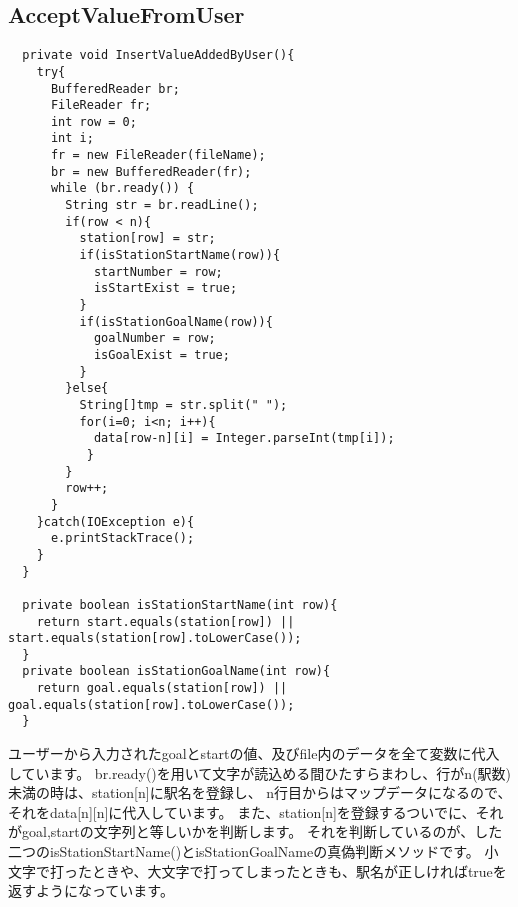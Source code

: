 \documentclass[titlepage]{jarticle}
\begin{document}
\subsection{AcceptValueFromUser}
\begin{verbatim}
  private void InsertValueAddedByUser(){
    try{
      BufferedReader br;
      FileReader fr;
      int row = 0;
      int i;
      fr = new FileReader(fileName);
      br = new BufferedReader(fr);
      while (br.ready()) {
        String str = br.readLine();
        if(row < n){
          station[row] = str;
          if(isStationStartName(row)){
            startNumber = row;
            isStartExist = true;
          }
          if(isStationGoalName(row)){
            goalNumber = row;
            isGoalExist = true;
          }
        }else{
          String[]tmp = str.split(" ");
          for(i=0; i<n; i++){
            data[row-n][i] = Integer.parseInt(tmp[i]);
           }
        }
        row++;
      }
    }catch(IOException e){
      e.printStackTrace();
    }
  }

  private boolean isStationStartName(int row){
    return start.equals(station[row]) || start.equals(station[row].toLowerCase());
  }
  private boolean isStationGoalName(int row){
    return goal.equals(station[row]) || goal.equals(station[row].toLowerCase());
  }

\end{verbatim}

ユーザーから入力されたgoalとstartの値、及びfile内のデータを全て変数に代入しています。
br.ready()を用いて文字が読込める間ひたすらまわし、行がn(駅数)未満の時は、station[n]に駅名を登録し、
n行目からはマップデータになるので、それをdata[n][n]に代入しています。
また、station[n]を登録するついでに、それがgoal,startの文字列と等しいかを判断します。
それを判断しているのが、した二つのisStationStartName()とisStationGoalNameの真偽判断メソッドです。
小文字で打ったときや、大文字で打ってしまったときも、駅名が正しければtrueを返すようになっています。
\end{document}
